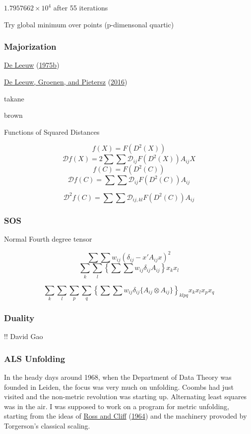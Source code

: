 \documentclass[
  12pt,
]{book}
\theoremstyle{definition}
\theoremstyle{definition}
\theoremstyle{definition}
\theoremstyle{definition}
\theoremstyle{remark}
\begin{document}
\ensuremath{1.7957662\times 10^{4}} after 55 iterations

Try global minimum over points (p-dimensonal quartic)

\hypertarget{majorization}{%
\subsubsection{Majorization}\label{majorization}}

\protect\hyperlink{ref-deleeuw_U_75b}{De Leeuw} (\protect\hyperlink{ref-deleeuw_U_75b}{1975b})

\protect\hyperlink{ref-deleeuw_groenen_pietersz_E_16m}{De Leeuw, Groenen, and Pietersz} (\protect\hyperlink{ref-deleeuw_groenen_pietersz_E_16m}{2016})

takane

brown

Functions of Squared Distances

\[
f(X)=F(D^2(X))
\]
\[
\mathcal{D}f(X)=2\sum\sum\mathcal{D}_{ij}F(D^2(X))A_{ij}X
\]
\[
f(C)=F(D^2(C))
\]
\[
\mathcal{D}f(C)=\sum\sum\mathcal{D}_{ij}F(D^2(C))A_{ij}
\]

\[
\mathcal{D}^2f(C)=\sum\sum\mathcal{D}_{ij,kl}F(D^2(C))A_{ij}
\]

\hypertarget{sos}{%
\subsubsection{SOS}\label{sos}}

Normal Fourth degree tensor

\[
\sum\sum w_{ij}(\delta_{ij}-x'A_{ij}x)^2
\]
\[
\sum_k\sum_l\left\{\sum\sum w_{ij}\delta_{ij}A_{ij}\right\}x_kx_l
\]

\[
\sum_{k}\sum_l\sum_{p}\sum_q\left\{\sum\sum w_{ij}\delta_{ij}\{A_{ij}\otimes A_{ij}\}\right\}_{klpq}x_kx_lx_px_q
\]

\hypertarget{duality}{%
\subsubsection{Duality}\label{duality}}

!! David Gao

\hypertarget{alsunfold}{%
\subsubsection{ALS Unfolding}\label{alsunfold}}

In the heady days around 1968, when the Department of Data Theory was founded in Leiden, the focus was very much on unfolding. Coombs had just visited and the non-metric revolution was starting up. Alternating least squares was in the air. I was supposed to work on a program for metric unfolding, starting from the ideas of \protect\hyperlink{ref-ross_cliff_64}{Ross and Cliff} (\protect\hyperlink{ref-ross_cliff_64}{1964}) and the machinery provoded by Torgerson's classical scaling.
\end{document}
